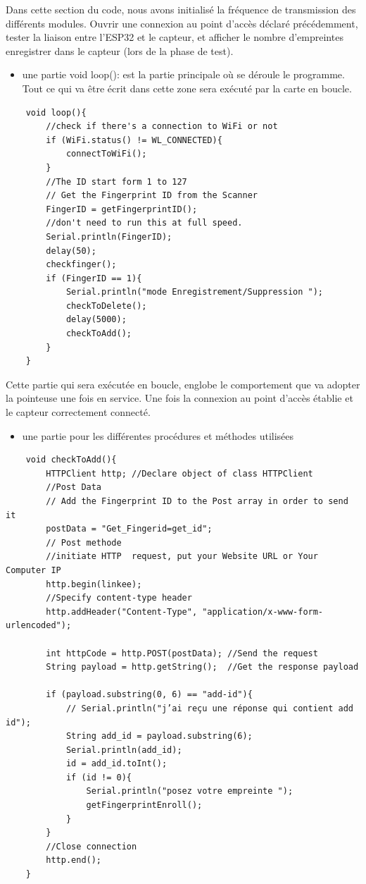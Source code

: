 Dans cette section du code, nous avons initialisé la fréquence de transmission
des différents modules. Ouvrir une connexion au point d’accès déclaré
précédemment, tester la liaison entre l’ESP32 et le capteur, et afficher le
nombre d’empreintes enregistrer dans le capteur (lors de la phase de test).      

\begin{itemize}
    \item [\textbullet] une partie void loop(): est la partie principale où se
        déroule le programme. Tout ce qui va être écrit dans cette zone sera
        exécuté par la carte en boucle. 
\end{itemize}

\begin{verbatim}
    void loop(){
        //check if there's a connection to WiFi or not
        if (WiFi.status() != WL_CONNECTED){
            connectToWiFi();
        }
        //The ID start form 1 to 127
        // Get the Fingerprint ID from the Scanner
        FingerID = getFingerprintID(); 
        //don't need to run this at full speed.
        Serial.println(FingerID);
        delay(50);
        checkfinger();
        if (FingerID == 1){
            Serial.println("mode Enregistrement/Suppression ");
            checkToDelete();
            delay(5000);
            checkToAdd();
        }
    }
\end{verbatim}

Cette partie qui sera exécutée en boucle, englobe le comportement que va adopter
la pointeuse une fois en service. Une fois la connexion au point d’accès établie
et le capteur correctement connecté.

\begin{itemize}
    \item[\textbullet] une partie pour les différentes procédures et méthodes
        utilisées
\end{itemize}

\begin{verbatim}
    void checkToAdd(){
        HTTPClient http; //Declare object of class HTTPClient
        //Post Data
        // Add the Fingerprint ID to the Post array in order to send it 
        postData = "Get_Fingerid=get_id"; 
        // Post methode
        //initiate HTTP  request, put your Website URL or Your Computer IP
        http.begin(linkee);                                              
        //Specify content-type header
        http.addHeader("Content-Type", "application/x-www-form-urlencoded"); 

        int httpCode = http.POST(postData); //Send the request
        String payload = http.getString();  //Get the response payload

        if (payload.substring(0, 6) == "add-id"){
            // Serial.println("j’ai reçu une réponse qui contient add id");
            String add_id = payload.substring(6);
            Serial.println(add_id);
            id = add_id.toInt();
            if (id != 0){
                Serial.println("posez votre empreinte ");
                getFingerprintEnroll();
            }
        }
        //Close connection
        http.end(); 
    }
\end{verbatim}

